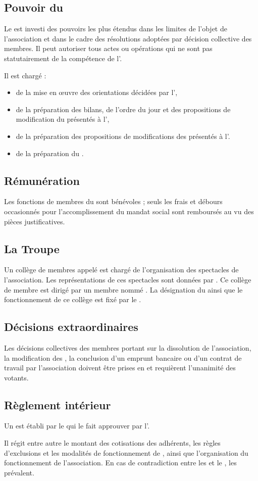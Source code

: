 \documentclass[a4paper,french,10pt]{article}
\newcommand{\article}[1]{\subsection{#1}\addtocounter{article}{1}}
\newcounter{article}
\begin{document}
\article{Pouvoir du \bureau{}}
\label{sec:pouvoirs}
Le \bureau{} est investi des pouvoirs les plus étendus dans les limites
de l’objet de l’association et dans le cadre des résolutions adoptées
par décision collective des membres. Il peut autoriser tous actes ou
opérations qui ne sont pas statutairement de la compétence de
l’\AG{}.

Il est chargé :
\begin{itemize}
\item de la mise en \oe{}uvre des orientations décidées par l'\AG{},

  \item de la préparation des bilans, de l'ordre du jour et des
  propositions de modification du \RI{} présentés à
  l'\AG{},

  \item de la préparation des propositions de modifications des \statuts{}
  présentés à l'\AGE{}.

  \item de la préparation du \RI{}.

  
\end{itemize}



\article{Rémunération}
\label{sec:remuneration}
Les fonctions de membres du \bureau{} sont bénévoles ; seuls les frais et
débours occasionnés pour l’accomplissement du mandat social sont
remboursés au vu des pièces justificatives.

\article{La Troupe}
\label{sec:troupe}
Un collège de membres appelé \textit{\troupe{}} est chargé de
l'organisation des spectacles de l'association. Les représentations de
ces spectacles sont données par \troupe{}. Ce collège de membre est
dirigé par un membre nommé \DA{}. La désignation du \DA{} ainsi que le
fonctionnement de ce collège est fixé par le \RI{}.

\article{Décisions extraordinaires}
\label{sec:decisions-extra}
Les décisions collectives des membres portant sur la dissolution de
l’association, la modification des \statuts{}, la conclusion d’un emprunt
bancaire ou d’un contrat de travail par l’association doivent être prises en \AG{} et requièrent l’unanimité des votants.

\article{Règlement intérieur}
\label{sec:reglement}
Un \RI{} est établi par le \bureau{} qui le fait approuver
par l’\AG{}.

Il régit entre autre le montant des cotisations des adhérents, les règles d'exclusions et les modalités de fonctionnement de \troupe{}, ainsi que l'organisation du fonctionnement de l'association. En cas de contradiction entre les \statuts{} et le \RI{}, les \statuts{} prévalent.
\end{document}
